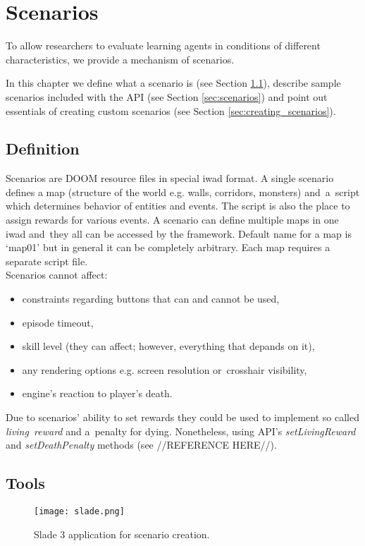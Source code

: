
\chapter{Scenarios}

To allow researchers to evaluate learning agents in conditions of different characteristics, we provide a mechanism of scenarios.

In this chapter we define what a scenario is (see Section \ref{sec:scenario_definition}), describe sample scenarios included with the API (see Section \ref{sec:scenarios}) and point out essentials of creating custom scenarios (see Section \ref{sec:creating_scenarios}).

\section{Definition}\label{sec:scenario_definition}
	Scenarios are DOOM resource files in special iwad format. A single scenario defines a map (structure of the world e.g. walls, corridors, monsters) and~a~script which determines behavior of entities and events. The script is also the place to assign rewards for various events. A scenario can define multiple maps in one iwad and~they all can be accessed by the framework. Default name for a map is `map01' but in general it can be completely arbitrary. Each map requires a separate script file.
	\\
	Scenarios cannot affect:
	\begin{itemize}
		\item constraints regarding buttons that can and cannot be used,
		\item episode timeout,
		\item skill level (they can affect; however, everything that depands on it),
		\item any rendering options e.g. screen resolution or~crosshair visibility,
		\item engine's reaction to player's death.
	\end{itemize}

	Due to scenarios' ability to set rewards they could be used to implement so called \emph{living~reward} and a~penalty for dying. Nonetheless, using API's \emph{setLivingReward} and \emph{setDeathPenalty} methods (see //REFERENCE HERE//).

\section{Tools}\label{sec:tools}
	\begin{figure}
			\centering
			\texttt{[image: slade.png]}
			\caption{Slade 3 application for scenario creation.}\label{fig:slade}
		\end{figure}

